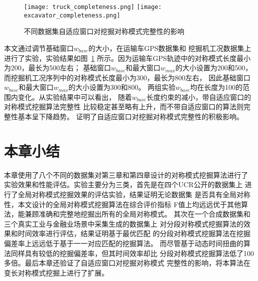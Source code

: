 \begin{figure}
    \centering
    {\texttt{[image: truck\_completeness.png]}}
    {\texttt{[image: excavator\_completeness.png]}}
    \caption{不同数据集自适应窗口对挖掘对称模式完整性的影响}
    \label{fig:completeness}
\end{figure}
本文通过调节基础窗口$w_{base}$的大小，在运输车GPS数据集和
挖掘机工况数据集上进行了实验，实验结果如图~\ref{fig:completeness}
所示。因为运输车GPS轨迹中的对称模式长度最小为200，最长为500左右；
基础窗口$w_{base}$和最大窗口$w_{max}$的大小设置为200和500，
而挖掘机工况序列中的对称模式长度最小为300，最长为800左右，
因此基础窗口$w_{base}$和最大窗口$w_{max}$的大小设置为300和800。
两组实验$w_{base}$均在长度为100的范围内变化。从实验结果中可以看出，
随着$w_{base}$长度约束的减小，带自适应窗口的对称模式挖掘算法完整性
比较稳定甚至略有上升，而不带自适应窗口的算法则完整性基本呈下降趋势。
证明了自适应窗口对挖掘对称模式完整性的积极影响。

\section{本章小结}
本章使用了八个不同的数据集对第三章和第四章设计的对称模式挖掘算法进行了
实验效果和性能评估。实验主要分为三类，首先是在四个UCR公开的数据集上
进行了全局对称模式挖掘效果的评估实验，结果证明无论数据集
是否具有全局对称性，本文设计的全局对称模式挖掘算法在综合评价指标
F值上均远远优于其他算法，能兼顾准确和完整地挖掘出所有的全局对称模式。
其次在一个合成数据集和三个真实工业与金融业场景中采集生成的数据集上
对分段对称模式挖掘算法的效果和时间效率进行评估，结果证明基于最优匹配
的分段对称模式挖掘算法在挖掘偏差率上远远低于基于一一对应匹配的挖掘算法。
而尽管基于动态时间扭曲的算法同样具有较低的挖掘偏差率，但其时间效率却比
分段对称模式挖掘算法低了100多倍。最后本章还验证了自适应窗口对挖掘对称模式
完整性的影响，将本算法在变长对称模式挖掘上进行了扩展。